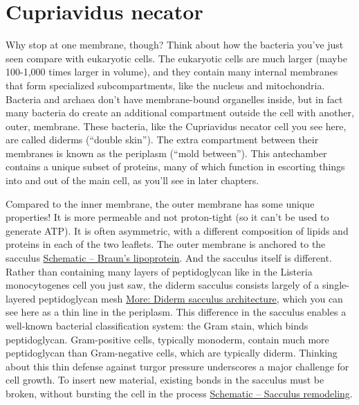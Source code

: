 \documentclass[]{tufte-book}
\begin{document}
\section{Cupriavidus necator}\label{cupriavidus-necator}

Why stop at one membrane, though? Think about how the bacteria you've
just seen compare with eukaryotic cells. The eukaryotic cells are much
larger (maybe 100-1,000 times larger in volume), and they contain many
internal membranes that form specialized subcompartments, like the
nucleus and mitochondria. Bacteria and archaea don't have membrane-bound
organelles inside, but in fact many bacteria do create an additional
compartment outside the cell with another, outer, membrane. These
bacteria, like the Cupriavidus necator cell you see here, are called
diderms (``double skin''). The extra compartment between their membranes
is known as the periplasm (``mold between''). This antechamber contains
a unique subset of proteins, many of which function in escorting things
into and out of the main cell, as you'll see in later chapters.

Compared to the inner membrane, the outer membrane has some unique
properties! It is more permeable and not proton-tight (so it can't be
used to generate ATP). It is often asymmetric, with a different
composition of lipids and proteins in each of the two leaflets. The
outer membrane is anchored to the sacculus
\protect\hyperlink{Brauns_lipoprotein}{Schematic -- Braun's
lipoprotein}. And the sacculus itself is different. Rather than
containing many layers of peptidoglycan like in the Listeria
monocytogenes cell you just saw, the diderm sacculus consists largely of
a single-layered peptidoglycan mesh
\protect\hyperlink{Diderm_sacculus_architecture}{More: Diderm sacculus
architecture}, which you can see here as a thin line in the periplasm.
This difference in the sacculus enables a well-known bacterial
classification system: the Gram stain, which binds peptidoglycan.
Gram-positive cells, typically monoderm, contain much more peptidoglycan
than Gram-negative cells, which are typically diderm. Thinking about
this thin defense against turgor pressure underscores a major challenge
for cell growth. To insert new material, existing bonds in the sacculus
must be broken, without bursting the cell in the process
\protect\hyperlink{Sacculus_remodeling}{Schematic -- Sacculus
remodeling}.
\end{document}
